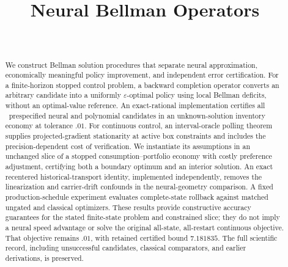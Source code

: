 
\makeatletter\gdef{}\makeatother
{}


\begin{frontmatter}
\title{Neural Bellman Operators}
\begin{aug}
\author[id=au1,addressref={add1}]{~}
\address[id=add1]{}
\end{aug}
\begin{abstract}
We construct Bellman solution procedures that separate neural approximation, economically meaningful policy improvement, and independent error certification. For a finite-horizon stopped control problem, a backward completion operator converts an arbitrary candidate into a uniformly $\varepsilon$-optimal policy using local Bellman deficits, without an optimal-value reference. An exact-rational implementation certifies all \InventoryCases\ prespecified neural and polynomial candidates in an unknown-solution inventory economy at tolerance $.01$. For continuous control, an interval-oracle polling theorem supplies projected-gradient stationarity at active box constraints and includes the precision-dependent cost of verification. We instantiate its assumptions in an unchanged slice of a stopped consumption--portfolio economy with costly preference adjustment, certifying both a boundary optimum and an interior solution. An exact recentered historical-transport identity, implemented independently, removes the linearization and carrier-drift confounds in the neural-geometry comparison. A fixed production-schedule experiment evaluates complete-state rollback against matched ungated and classical optimizers. These results provide constructive accuracy guarantees for the stated finite-state problem and constrained slice; they do not imply a neural speed advantage or solve the original all-state, all-restart continuous objective. That objective remains $.01$, with retained certified bound $7.181835$. The full scientific record, including unsuccessful candidates, classical comparators, and earlier derivations, is preserved.
\end{abstract}
\begin{keyword}\end{keyword}
\end{frontmatter}




